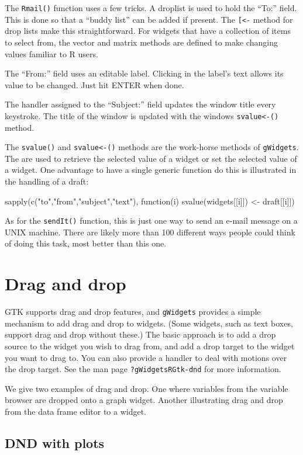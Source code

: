 \documentclass[12pt]{article}
\newcommand{\RCode}[1]{\texttt{#1}}
\newcommand{\RFunc}[1]{\texttt{#1()}}
\begin{document}
The \RFunc{Rmail} function uses a few  tricks.  A droplist is
used to hold the ``To:'' field. This is done so that a ``buddy list''
can be added if present. The \RCode{[<-} method for drop lists make
this straightforward. For widgets that have a collection of items to
select from, the vector and matrix methods are defined to make
changing values familiar to R users.

The ``From:'' field uses an editable label. Clicking in the label's
text allows its value to be changed. Just hit ENTER when done.

The handler assigned to the ``Subject:'' field updates the window
title every keystroke. The title of the window is updated with the windows
\RFunc{svalue<-} method.

The \RFunc{svalue} and \RFunc{svalue<-} methods are the work-horse
methods of \RCode{gWidgets}. The are used to retrieve the selected
value of a widget or set the selected value of a widget. One advantage
to have a single generic function do this is illustrated in the
handling of a draft:
\begin{Soutput}
 sapply(c("to","from","subject","text"), function(i)
   svalue(widgets[[i]]) <- draft[[i]])
\end{Soutput}

As for the \RFunc{sendIt} function, this is just one way to send an
e-mail message on a UNIX machine. There are likely more than 100
different ways people could think of doing this task, most better than
this one.

\section{Drag and drop}
GTK supports drag and drop features, and \RCode{gWidgets} provides a
simple mechanism to add drag and drop to widgets. (Some widgets, such
as text boxes, support drag and drop without these.) The basic
approach is to add a drop source to the widget you wish to drag from,
and add a drop target to the widget you want to drag to. You can also
provide a handler to deal with motions over the drop target. See the
man page \RCode{?gWidgetsRGtk-dnd} for more information.

We give two examples of drag and drop. One where variables from the
variable browser are dropped onto a graph widget. Another illustrating
drag and drop from the data frame editor to a widget.

\subsection{DND with plots}
\end{document}
